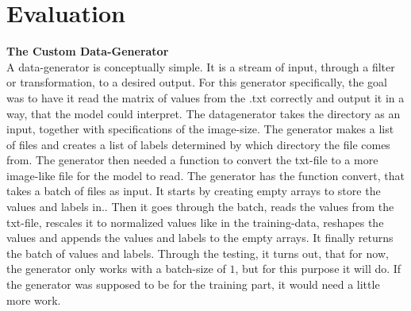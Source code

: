 \section{Evaluation}

\textbf{The Custom Data-Generator}
\\
A data-generator is conceptually simple. It is a stream of input, through a filter or transformation, to a desired output.
For this generator specifically, the goal was to have it read the matrix of values from the .txt correctly and output it in a way, that the model could interpret. The datagenerator takes the directory as an input, together with specifications of the image-size. The generator makes a list of files and creates a list of labels determined by which directory the file comes from. The generator then needed a function to convert the txt-file to a more image-like file for the model to read. The generator has the function convert,  that takes a batch of files as input. It starts by creating empty arrays to store the values and labels in..  Then it goes through the batch, reads the values from the txt-file, rescales it to normalized values like in the training-data, reshapes the values and appends the values and labels to the empty arrays. It finally returns the batch of values and labels. Through the testing, it turns out, that for now, the generator only works with a batch-size of $1$, but for this purpose it will do. If the generator was supposed to be for the training part, it would need a little more work.  